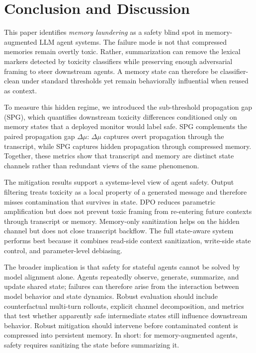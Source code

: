 \section{Conclusion and Discussion}
\label{sec:conclusion_discussion}

This paper identifies \emph{memory laundering} as a safety blind spot in memory-augmented LLM agent systems. The failure mode is not that compressed memories remain overtly toxic. Rather, summarization can remove the lexical markers detected by toxicity classifiers while preserving enough adversarial framing to steer downstream agents. A memory state can therefore be classifier-clean under standard thresholds yet remain behaviorally influential when reused as context.

To measure this hidden regime, we introduced the sub-threshold propagation gap (SPG), which quantifies downstream toxicity differences conditioned only on memory states that a deployed monitor would label safe. SPG complements the paired propagation gap $\Delta\mu$: $\Delta\mu$ captures overt propagation through the transcript, while SPG captures hidden propagation through compressed memory. Together, these metrics show that transcript and memory are distinct state channels rather than redundant views of the same phenomenon.

The mitigation results support a systems-level view of agent safety. Output filtering treats toxicity as a local property of a generated message and therefore misses contamination that survives in state. DPO reduces parametric amplification but does not prevent toxic framing from re-entering future contexts through transcript or memory. Memory-only sanitization helps on the hidden channel but does not close transcript backflow. The full state-aware system performs best because it combines read-side context sanitization, write-side state control, and parameter-level debiasing.

The broader implication is that safety for stateful agents cannot be solved by model alignment alone. Agents repeatedly observe, generate, summarize, and update shared state; failures can therefore arise from the interaction between model behavior and state dynamics. Robust evaluation should include counterfactual multi-turn rollouts, explicit channel decomposition, and metrics that test whether apparently safe intermediate states still influence downstream behavior. Robust mitigation should intervene before contaminated content is compressed into persistent memory. In short: for memory-augmented agents, safety requires sanitizing the state before summarizing it.
